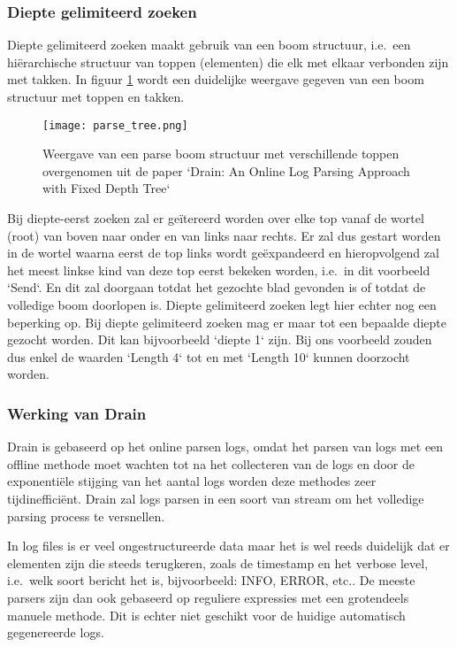 \subsubsection{Diepte gelimiteerd zoeken}
Diepte gelimiteerd zoeken maakt gebruik van een boom structuur, i.e.\ een hiërarchische structuur van toppen (elementen) die elk met elkaar verbonden zijn met takken. In figuur \ref{pic:Drainparseboom} wordt een duidelijke weergave gegeven van een boom structuur met toppen en takken.

\begin{figure}[!htp]
    \texttt{[image: parse\_tree.png]}
    \caption{Weergave van een parse boom structuur met verschillende toppen overgenomen uit de paper `Drain: An Online Log Parsing Approach with Fixed Depth Tree`~\autocite{he2017drain}}
    \label{pic:Drainparseboom}
\end{figure}

Bij diepte-eerst zoeken zal er geïtereerd worden over elke top vanaf de wortel (root) van boven naar onder en van links naar rechts. Er zal dus gestart worden in de wortel waarna eerst de top links wordt geëxpandeerd en hieropvolgend zal het meest linkse kind van deze top eerst bekeken worden, i.e.\ in dit voorbeeld `Send`. En dit zal doorgaan totdat het gezochte blad gevonden is of totdat de volledige boom doorlopen is. Diepte gelimiteerd zoeken legt hier echter nog een beperking op. Bij diepte gelimiteerd zoeken mag er maar tot een bepaalde diepte gezocht worden. Dit kan bijvoorbeeld `diepte 1` zijn. Bij ons voorbeeld zouden dus enkel de waarden `Length 4` tot en met `Length 10` kunnen doorzocht worden. 

\subsubsection{Werking van Drain}
Drain is gebaseerd op het online parsen logs, omdat het parsen van logs met een offline methode moet wachten tot na het collecteren van de logs en door de exponentiële stijging van het aantal logs worden deze methodes zeer tijdinefficiënt. Drain zal logs parsen in een soort van stream om het volledige parsing process te versnellen. 

In log files is er veel ongestructureerde data maar het is wel reeds duidelijk dat er elementen zijn die steeds terugkeren, zoals de timestamp en het verbose level, i.e.\ welk soort bericht het is, bijvoorbeeld: INFO, ERROR, etc.. De meeste parsers zijn dan ook gebaseerd op reguliere expressies met een grotendeels manuele methode. Dit is echter niet geschikt voor de huidige automatisch gegenereerde logs. 

